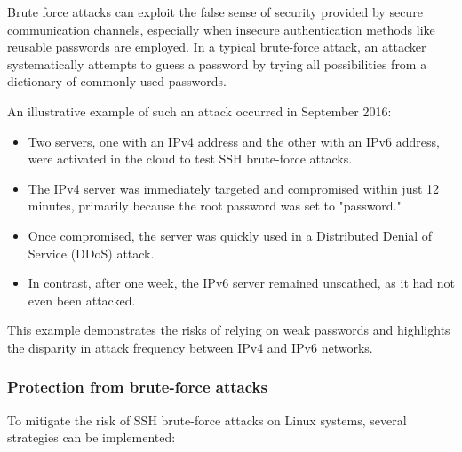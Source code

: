 Brute force attacks can exploit the false sense of security provided
by secure communication channels, especially when insecure
authentication methods like reusable passwords are employed. In a
typical brute-force attack, an attacker systematically attempts to
guess a password by trying all possibilities from a dictionary of
commonly used passwords.

An illustrative example of such an attack occurred in September 2016:
\begin{itemize}
    \item Two servers, one with an IPv4 address and the other with an
      IPv6 address, were activated in the cloud to test SSH
      brute-force attacks.
    \item The IPv4 server was immediately targeted and compromised
      within just 12 minutes, primarily because the root password was
      set to "password." 
    \item Once compromised, the server was quickly used in a
      Distributed Denial of Service (DDoS) attack.
    \item In contrast, after one week, the IPv6 server remained
      unscathed, as it had not even been attacked.
\end{itemize}

This example demonstrates the risks of relying on weak passwords and
highlights the disparity in attack frequency between IPv4 and IPv6
networks.


\subsubsection{Protection from brute-force attacks}

To mitigate the risk of SSH brute-force attacks on Linux systems,
several strategies can be implemented:

